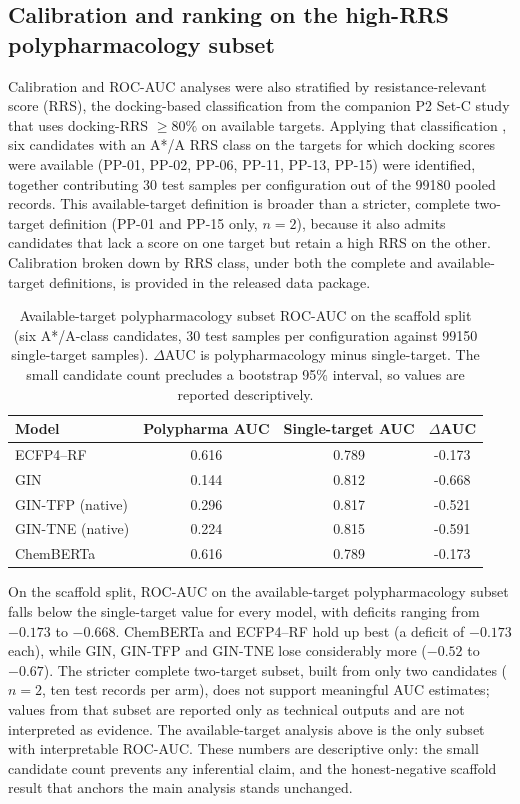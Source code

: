 \documentclass[11pt,a4paper]{article}
\begin{document}
\subsection{Calibration and ranking on the high-RRS polypharmacology subset}
\label{sec:polypharma_si}

Calibration and ROC-AUC analyses were also stratified by resistance-relevant score (RRS), the docking-based classification from the companion P2 Set-C study that uses docking-RRS $\ge 80\%$ on available targets. Applying that classification \citep{temgoua2027md}, six candidates with an A*/A RRS class on the targets for which docking scores were available (PP-01, PP-02, PP-06, PP-11, PP-13, PP-15) were identified, together contributing \num{30} test samples per configuration out of the \num{99180} pooled records. This available-target definition is broader than a stricter, complete two-target definition (PP-01 and PP-15 only, $n=2$), because it also admits candidates that lack a score on one target but retain a high RRS on the other. Calibration broken down by RRS class, under both the complete and available-target definitions, is provided in the released data package.

\begin{table}[h]
\centering
\caption{Available-target polypharmacology subset ROC-AUC on the scaffold split (six A*/A-class candidates, \num{30} test samples per configuration against \num{99150} single-target samples). $\Delta$AUC is polypharmacology minus single-target. The small candidate count precludes a bootstrap 95\% interval, so values are reported descriptively.}
\label{tab:s2_polypharma_available}
\small
\begin{tabular}{l S[table-format=1.3] S[table-format=1.3] S[table-format=-1.3]}
\toprule
Model & {Polypharma AUC} & {Single-target AUC} & {$\Delta$AUC} \\
\midrule
ECFP4--RF & 0.616 & 0.789 & -0.173 \\
GIN & 0.144 & 0.812 & -0.668 \\
GIN-TFP (native) & 0.296 & 0.817 & -0.521 \\
GIN-TNE (native) & 0.224 & 0.815 & -0.591 \\
ChemBERTa & 0.616 & 0.789 & -0.173 \\
\bottomrule
\end{tabular}
\end{table}

On the scaffold split, ROC-AUC on the available-target polypharmacology subset falls below the single-target value for every model, with deficits ranging from $-\num{0.173}$ to $-\num{0.668}$. ChemBERTa and ECFP4--RF hold up best (a deficit of $-\num{0.173}$ each), while GIN, GIN-TFP and GIN-TNE lose considerably more ($-\num{0.52}$ to $-\num{0.67}$). The stricter complete two-target subset, built from only two candidates ($n=2$, ten test records per arm), does not support meaningful AUC estimates; values from that subset are reported only as technical outputs and are not interpreted as evidence. The available-target analysis above is the only subset with interpretable ROC-AUC. These numbers are descriptive only: the small candidate count prevents any inferential claim, and the honest-negative scaffold result that anchors the main analysis stands unchanged.
\end{document}
